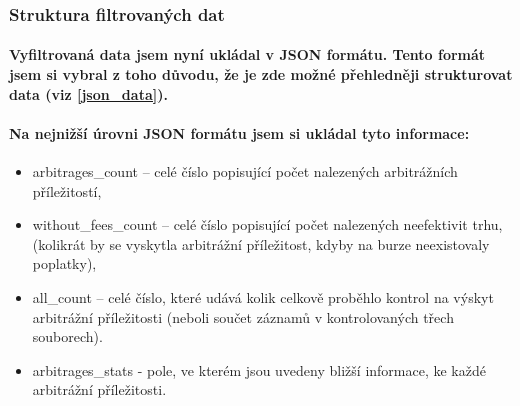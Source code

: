 \documentclass[thesis=B,czech]{FITthesis}[2019/03/21]
\begin{document}
\subsubsection{Struktura filtrovaných dat}
\paragraph{
Vyfiltrovaná data jsem nyní ukládal v JSON formátu. Tento formát jsem si vybral z toho důvodu, že je zde možné přehledněji strukturovat data (viz \ref{json_data}).
}
\paragraph{
Na nejnižší úrovni JSON formátu jsem si ukládal tyto informace:
}
\begin{itemize}
    \item arbitrages\_count -- celé číslo popisující počet nalezených arbitrážních příležitostí,
    \item without\_fees\_count -- celé číslo popisující počet nalezených neefektivit trhu, (kolikrát by se vyskytla arbitrážní příležitost, kdyby na burze neexistovaly poplatky), 
    \item all\_count -- celé číslo, které udává kolik celkově proběhlo kontrol na výskyt arbitrážní příležitosti (neboli součet záznamů v kontrolovaných třech souborech).
    \item arbitrages\_stats - pole, ve kterém jsou uvedeny bližší informace, ke každé arbitrážní příležitosti. 
\end{itemize}
\end{document}
